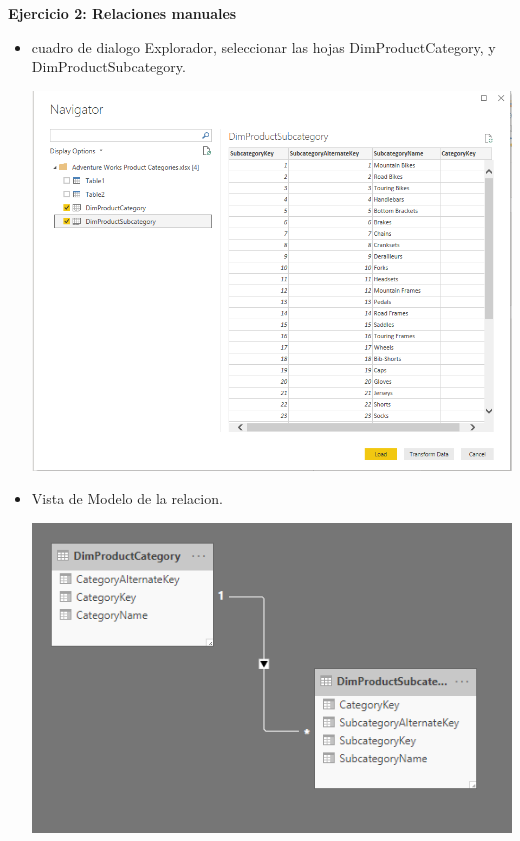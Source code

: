 \textbf{Ejercicio 2: Relaciones manuales}


\begin{itemize}
	\item cuadro de dialogo Explorador, seleccionar las hojas DimProductCategory, y DimProductSubcategory.
	\begin{center}
	\includegraphics[width=13cm]{./Imagenes/Captura2-1} 
	\end{center}
\end{itemize} 

\begin{itemize}
	\item Vista de Modelo de la relacion.
	\begin{center}
	\includegraphics[width=13cm]{./Imagenes/Captura2-2} 
	\end{center}
\end{itemize} 

